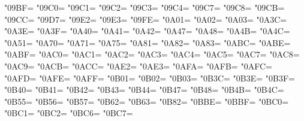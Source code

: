 \XeTeXcharclass"09BF=\KclassCM
\XeTeXcharclass"09C0=\KclassCM
\XeTeXcharclass"09C1=\KclassCM
\XeTeXcharclass"09C2=\KclassCM
\XeTeXcharclass"09C3=\KclassCM
\XeTeXcharclass"09C4=\KclassCM
\XeTeXcharclass"09C7=\KclassCM
\XeTeXcharclass"09C8=\KclassCM
\XeTeXcharclass"09CB=\KclassCM
\XeTeXcharclass"09CC=\KclassCM
\XeTeXcharclass"09D7=\KclassCM
\XeTeXcharclass"09E2=\KclassCM
\XeTeXcharclass"09E3=\KclassCM
\XeTeXcharclass"09FE=\KclassCM
\XeTeXcharclass"0A01=\KclassCM
\XeTeXcharclass"0A02=\KclassCM
\XeTeXcharclass"0A03=\KclassCM
\XeTeXcharclass"0A3C=\KclassCM
\XeTeXcharclass"0A3E=\KclassCM
\XeTeXcharclass"0A3F=\KclassCM
\XeTeXcharclass"0A40=\KclassCM
\XeTeXcharclass"0A41=\KclassCM
\XeTeXcharclass"0A42=\KclassCM
\XeTeXcharclass"0A47=\KclassCM
\XeTeXcharclass"0A48=\KclassCM
\XeTeXcharclass"0A4B=\KclassCM
\XeTeXcharclass"0A4C=\KclassCM
\XeTeXcharclass"0A51=\KclassCM
\XeTeXcharclass"0A70=\KclassCM
\XeTeXcharclass"0A71=\KclassCM
\XeTeXcharclass"0A75=\KclassCM
\XeTeXcharclass"0A81=\KclassCM
\XeTeXcharclass"0A82=\KclassCM
\XeTeXcharclass"0A83=\KclassCM
\XeTeXcharclass"0ABC=\KclassCM
\XeTeXcharclass"0ABE=\KclassCM
\XeTeXcharclass"0ABF=\KclassCM
\XeTeXcharclass"0AC0=\KclassCM
\XeTeXcharclass"0AC1=\KclassCM
\XeTeXcharclass"0AC2=\KclassCM
\XeTeXcharclass"0AC3=\KclassCM
\XeTeXcharclass"0AC4=\KclassCM
\XeTeXcharclass"0AC5=\KclassCM
\XeTeXcharclass"0AC7=\KclassCM
\XeTeXcharclass"0AC8=\KclassCM
\XeTeXcharclass"0AC9=\KclassCM
\XeTeXcharclass"0ACB=\KclassCM
\XeTeXcharclass"0ACC=\KclassCM
\XeTeXcharclass"0AE2=\KclassCM
\XeTeXcharclass"0AE3=\KclassCM
\XeTeXcharclass"0AFA=\KclassCM
\XeTeXcharclass"0AFB=\KclassCM
\XeTeXcharclass"0AFC=\KclassCM
\XeTeXcharclass"0AFD=\KclassCM
\XeTeXcharclass"0AFE=\KclassCM
\XeTeXcharclass"0AFF=\KclassCM
\XeTeXcharclass"0B01=\KclassCM
\XeTeXcharclass"0B02=\KclassCM
\XeTeXcharclass"0B03=\KclassCM
\XeTeXcharclass"0B3C=\KclassCM
\XeTeXcharclass"0B3E=\KclassCM
\XeTeXcharclass"0B3F=\KclassCM
\XeTeXcharclass"0B40=\KclassCM
\XeTeXcharclass"0B41=\KclassCM
\XeTeXcharclass"0B42=\KclassCM
\XeTeXcharclass"0B43=\KclassCM
\XeTeXcharclass"0B44=\KclassCM
\XeTeXcharclass"0B47=\KclassCM
\XeTeXcharclass"0B48=\KclassCM
\XeTeXcharclass"0B4B=\KclassCM
\XeTeXcharclass"0B4C=\KclassCM
\XeTeXcharclass"0B55=\KclassCM
\XeTeXcharclass"0B56=\KclassCM
\XeTeXcharclass"0B57=\KclassCM
\XeTeXcharclass"0B62=\KclassCM
\XeTeXcharclass"0B63=\KclassCM
\XeTeXcharclass"0B82=\KclassCM
\XeTeXcharclass"0BBE=\KclassCM
\XeTeXcharclass"0BBF=\KclassCM
\XeTeXcharclass"0BC0=\KclassCM
\XeTeXcharclass"0BC1=\KclassCM
\XeTeXcharclass"0BC2=\KclassCM
\XeTeXcharclass"0BC6=\KclassCM
\XeTeXcharclass"0BC7=\KclassCM
